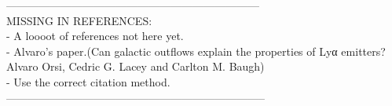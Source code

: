 \documentclass{latex/emulateapj}
\begin{document}
---------------------------------------------------------------------\\
MISSING IN REFERENCES: \\
- A loooot of references not here yet.\\
- Alvaro's paper.(Can galactic outflows explain the properties of Lyα emitters?
Alvaro Orsi, Cedric G. Lacey and Carlton M. Baugh)\\
- Use the correct citation method. \\
-----------------------------------------------------------------------\\




\newpage

%
%  
%
%
% 
%
%
%
\end{document}
